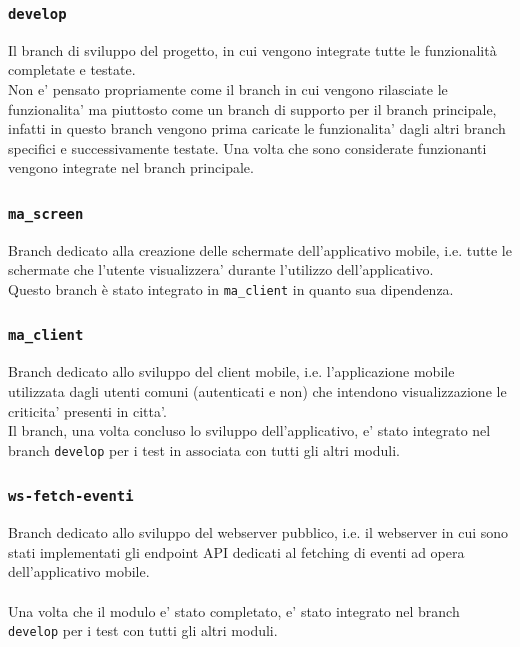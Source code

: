 \documentclass{article}
\begin{document}
\subsubsection{\texttt{develop}}
Il branch di sviluppo del progetto, in cui vengono integrate tutte le funzionalità completate e testate.\\
Non e' pensato propriamente come il branch in cui vengono rilasciate le funzionalita' ma piuttosto come un branch di supporto per il branch principale, infatti in questo branch vengono prima caricate le funzionalita' dagli altri branch specifici e successivamente testate. Una volta che sono considerate funzionanti vengono integrate nel branch principale.

\subsubsection{\texttt{ma\_screen}}
Branch dedicato alla creazione delle schermate dell'applicativo mobile, i.e. tutte le schermate che l'utente visualizzera' durante l'utilizzo dell'applicativo.\\
Questo branch è stato integrato in \texttt{ma\_client} in quanto sua dipendenza.

\subsubsection{\texttt{ma\_client}}
Branch dedicato allo sviluppo del client mobile, i.e. l'applicazione mobile utilizzata dagli utenti comuni (autenticati e non) che intendono visualizzazione le criticita' presenti in citta'.\\
Il branch, una volta concluso lo sviluppo dell'applicativo, e' stato integrato nel branch \texttt{develop} per i test in associata con tutti gli altri moduli.

\subsubsection{\texttt{ws-fetch-eventi}}
Branch dedicato allo sviluppo del webserver pubblico, i.e. il webserver in cui sono stati implementati gli endpoint API dedicati al fetching di eventi ad opera dell'applicativo mobile.\\
\\
Una volta che il modulo e' stato completato, e' stato integrato nel branch \texttt{develop} per i test con tutti gli altri moduli.
\end{document}
